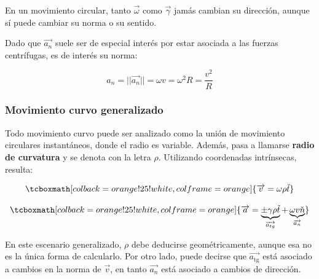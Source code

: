 \documentclass{article}
\begin{document}
En un movimiento circular, tanto $\overrightarrow{\omega}$ como $\overrightarrow{\gamma}$ jamás cambian su dirección, aunque sí puede cambiar su norma o su sentido.

Dado que $\overrightarrow{a_n}$ suele ser de especial interés por estar asociada a las fuerzas centrífugas, es de interés su norma:

\begin{equation}
a_n = ||\overrightarrow{a_n}|| = \omega v = \omega^2 R = \frac{v^2}{R}
\end{equation}

\subsubsection{Movimiento curvo generalizado}

Todo movimiento curvo puede ser analizado como la unión de movimiento circulares instantáneos, donde el radio es variable. Además, pasa a llamarse \textbf{radio de curvatura} y se denota con la letra $\rho$. Utilizando coordenadas intrínsecas, resulta:

\begin{equation}
\tcboxmath[colback=orange!25!white,colframe=orange]{
\overrightarrow{v} = \omega \rho \check{t}
}
\end{equation}

\begin{equation}
\tcboxmath[colback=orange!25!white,colframe=orange]{
\overrightarrow{a} = \underbrace{ \pm \gamma \rho \check{t} }_{\overrightarrow{a_{\mathop{tg}}}} + \underbrace{ \omega v \check{n} }_{\overrightarrow{a_n}}
}
\end{equation}

En este escenario generalizado, $\rho$ debe deducirse geométricamente, aunque esa no es la única forma de calcularlo. Por otro lado, puede decirse que $\overrightarrow{a_{\mathop{tg}}}$ está asociado a cambios en la norma de $\overrightarrow{v}$, en tanto $\overrightarrow{a_n}$ está asociado a cambios de dirección. 
\end{document}
